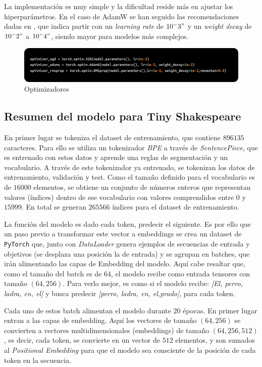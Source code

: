 \documentclass[11pt]{book}
\begin{document}
La implementación es muy simple y la dificultad reside más en ajustar los hiperparámetros. En el caso de AdamW se han seguido las recomendaciones dadas en \parencite{datacamp_adamw_pytorch}, que indica partir con un \textit{learning rate} de $10^-3"$ y un \textit{weight decay} de $10^-2"$ a $10^-4"$, siendo mayor para modelos más complejos. 


\begin{figure}[h]
    \centering
    \includegraphics[width=0.5\linewidth]{img/optimizers.png}
    \caption{Optimizadores \parencite{stackoverflow_sgd_optimizer}}
    \label{fig:placeholder22}
\end{figure}


\subsection{Resumen del modelo para Tiny Shakespeare}

En primer lugar se tokeniza el dataset de entrenamiento, que contiene $896135$ caracteres. Para ello se utiliza un tokenizador \textit{BPE} a través de \textit{SentencePiece}, que es entrenado con estos datos y aprende una reglas de segmentación y un vocabulario. A través de este tokenizador ya entrenado, se tokenizan los datos de entrenamiento, validación y test. Como el tamaño definido para el vocabulario es de $16000$ elementos, se obtiene un conjunto de números enteros que representan valores (índices) dentro de ese vocabulario con valores comprendidos entre $0$ y $15999$. En total se generan $265566$ índices para el dataset de entrenamiento. 

La función del modelo es dado cada token, predecir el siguiente. Es por ello que un paso previo a transformar este vector a embeddings se crea un dataset de \texttt{PyTorch} que, junto con \textit{DataLoader} genera ejemplos de secuencias de entrada y objetivos (se desplaza una posición la de entrada) y se agrupan en batches, que irán alimentando las capas de Embedding del modelo. Aquí cabe resaltar que, como el tamaño del batch es de $64$, el modelo recibe como entrada tensores con tamaño $(64,256)$. Para verlo mejor, es como si el modelo recibe: \textit{[El, perro, ladra, en, el]} y busca predecir \textit{[perro, ladra, en, el,prado]}, para cada token.


Cada uno de estos batch alimentan el modelo durante $20$ épocas. En primer lugar entran a las capas de embedding. Aquí los vectores de tamaño $(64,256)$ se convierten a vectores multidimensionales (embeddings) de tamaño $(64,256, 512)$, es decir, cada token, se convierte en un vector de $512$ elementos, y son sumados al \textit{Positional Embedding} para que el modelo sea consciente de la posición de cada token en la secuencia. 
\end{document}
